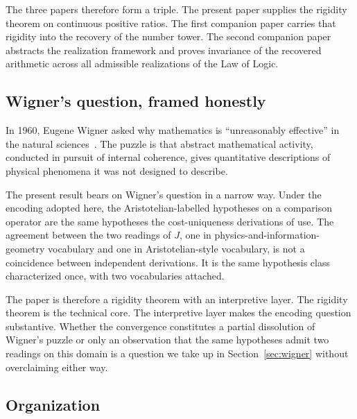 \documentclass[11pt,a4paper]{article}
\theoremstyle{definition}
\theoremstyle{remark}
\begin{document}
The three papers therefore form a triple. The present paper supplies
the rigidity theorem on continuous positive ratios. The first
companion paper carries that rigidity into the recovery of the number
tower. The second companion paper abstracts the realization framework
and proves invariance of the recovered arithmetic across all
admissible realizations of the Law of Logic.

\subsection{Wigner's question, framed honestly}

In 1960, Eugene Wigner asked why mathematics is ``unreasonably
effective'' in the natural sciences~\cite{Wigner1960}. The puzzle is
that abstract mathematical activity, conducted in pursuit of internal
coherence, gives quantitative descriptions of physical phenomena it
was not designed to describe.

The present result bears on Wigner's question in a narrow way. Under
the encoding adopted here, the Aristotelian-labelled hypotheses on a
comparison operator are the same hypotheses the cost-uniqueness
derivations of \cite{WashburnZlatanovicAllahyarov2026,
WashburnZlatanovic2026} use. The agreement between the two readings of
$J$, one in physics-and-information-geometry vocabulary and one in
Aristotelian-style vocabulary, is not a coincidence between
independent derivations. It is the same hypothesis class characterized
once, with two vocabularies attached.

The paper is therefore a rigidity theorem with an interpretive layer.
The rigidity theorem is the technical core. The interpretive layer
makes the encoding question substantive. Whether the convergence
constitutes a partial dissolution of Wigner's puzzle or only an
observation that the same hypotheses admit two readings on this
domain is a question we take up in Section~\ref{sec:wigner} without
overclaiming either way.

\subsection{Organization}
\end{document}
